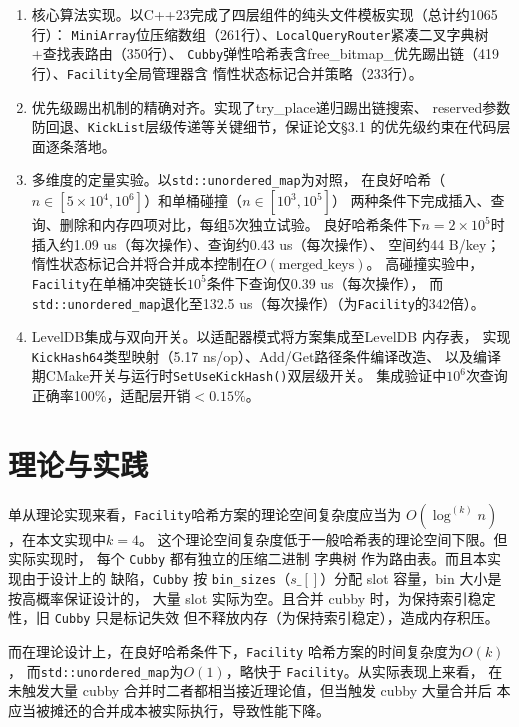 \documentclass[
    type = bachelor,
    fontset = win,
    decl-page = true,
  ]{njuthesis}
\begin{document}
\begin{enumerate}
  \item 核心算法实现。以C++23完成了四层组件的纯头文件模板实现（总计约1065行）：
    \texttt{MiniArray}位压缩数组（261行）、\texttt{LocalQueryRouter}紧凑二叉字典树+查找表路由（350行）、
    \texttt{Cubby}弹性哈希表含free\_bitmap\_优先踢出链（419行）、\texttt{Facility}全局管理器含
    惰性状态标记合并策略（233行）。

  \item 优先级踢出机制的精确对齐。实现了try\_place递归踢出链搜索、
    reserved参数防回退、\texttt{KickList}层级传递等关键细节，保证论文\S3.1\cite{1}
    的优先级约束在代码层面逐条落地。

  \item 多维度的定量实验。以\texttt{std::unordered\_map}为对照，
    在良好哈希（$n\in[5\times10^4,10^6]$）和单桶碰撞（$n\in[10^3,10^5]$）
    两种条件下完成插入、查询、删除和内存四项对比，每组5次独立试验。
    良好哈希条件下$n=2\times10^5$时插入约1.09 us（每次操作）、查询约0.43 us（每次操作）、
    空间约44 B/key；惰性状态标记合并将合并成本控制在$O(\text{merged\_keys})$。
    高碰撞实验中，\texttt{Facility}在单桶冲突链长$10^5$条件下查询仅0.39 us（每次操作），
    而\texttt{std::unordered\_map}退化至132.5 us（每次操作）（为\texttt{Facility}的342倍）。

  \item LevelDB集成与双向开关。以适配器模式将方案集成至LevelDB 内存表，
    实现\texttt{KickHash64}类型映射（5.17 ns/op）、Add/Get路径条件编译改造、
    以及编译期CMake开关与运行时\texttt{SetUseKickHash()}双层级开关。
    集成验证中$10^6$次查询正确率100\%，适配层开销$<0.15\%$。
\end{enumerate}

\section{理论与实践}
单从理论实现来看，\texttt{Facility}哈希方案的理论空间复杂度应当为
$O(\log ^{(k)}n)$，在本文实现中$k=4$。
这个理论空间复杂度低于一般哈希表的理论空间下限。但实际实现时，
每个 \texttt{Cubby} 都有独立的压缩二进制 字典树 作为路由表。而且本实现由于设计上的
缺陷，\texttt{Cubby} 按 \texttt{bin\_sizes}（$s\_[]$）分配 slot 容量，bin 大小是按高概率保证设计的，
大量 slot 实际为空。且合并 cubby 时，为保持索引稳定性，旧 \texttt{Cubby} 只是标记失效
但不释放内存（为保持索引稳定），造成内存积压。

而在理论设计上，在良好哈希条件下，\texttt{Facility} 哈希方案的时间复杂度为$O(k)$，
而\texttt{std::unordered\_map}为$O(1)$，略快于 \texttt{Facility}。从实际表现上来看，
在未触发大量 cubby 合并时二者都相当接近理论值，但当触发 cubby 大量合并后
本应当被摊还的合并成本被实际执行，导致性能下降。
\end{document}
